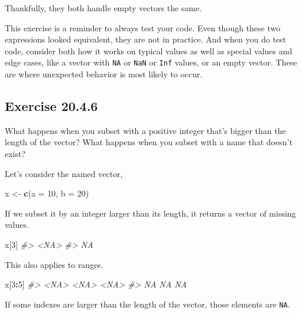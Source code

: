 \documentclass[]{book}
\newenvironment{Shaded}{\begin{snugshade}}{\end{snugshade}}
\newcommand{\CommentTok}[1]{\textcolor[rgb]{0.56,0.35,0.01}{\textit{#1}}}
\newcommand{\DataTypeTok}[1]{\textcolor[rgb]{0.13,0.29,0.53}{#1}}
\newcommand{\DecValTok}[1]{\textcolor[rgb]{0.00,0.00,0.81}{#1}}
\newcommand{\KeywordTok}[1]{\textcolor[rgb]{0.13,0.29,0.53}{\textbf{#1}}}
\newcommand{\NormalTok}[1]{#1}
\newcommand{\OperatorTok}[1]{\textcolor[rgb]{0.81,0.36,0.00}{\textbf{#1}}}
\newcommand{\StringTok}[1]{\textcolor[rgb]{0.31,0.60,0.02}{#1}}
\theoremstyle{plain}
\theoremstyle{remark}
\begin{document}
Thankfully, they both handle empty vectors the same.

This exercise is a reminder to always test your code. Even though these
two expressions looked equivalent, they are not in practice. And when
you do test code, consider both how it works on typical values as well
as special values and edge cases, like a vector with \texttt{NA} or
\texttt{NaN} or \texttt{Inf} values, or an empty vector. These are where
unexpected behavior is most likely to occur.

\hypertarget{exercise-20.4.6}{%
\subsection*{\texorpdfstring{Exercise
{20.4.6}}{Exercise 20.4.6}}\label{exercise-20.4.6}}

What happens when you subset with a positive integer that's bigger than
the length of the vector? What happens when you subset with a name that
doesn't exist?

Let's consider the named vector,

\begin{Shaded}
\begin{Highlighting}[]
\NormalTok{x <-}\StringTok{ }\KeywordTok{c}\NormalTok{(}\DataTypeTok{a =} \DecValTok{10}\NormalTok{, }\DataTypeTok{b =} \DecValTok{20}\NormalTok{)}
\end{Highlighting}
\end{Shaded}

If we subset it by an integer larger than its length, it returns a
vector of missing values.

\begin{Shaded}
\begin{Highlighting}[]
\NormalTok{x[}\DecValTok{3}\NormalTok{]}
\CommentTok{#> <NA> }
\CommentTok{#>   NA}
\end{Highlighting}
\end{Shaded}

This also applies to ranges.

\begin{Shaded}
\begin{Highlighting}[]
\NormalTok{x[}\DecValTok{3}\OperatorTok{:}\DecValTok{5}\NormalTok{]}
\CommentTok{#> <NA> <NA> <NA> }
\CommentTok{#>   NA   NA   NA}
\end{Highlighting}
\end{Shaded}

If some indexes are larger than the length of the vector, those elements
are \texttt{NA}.
\end{document}
